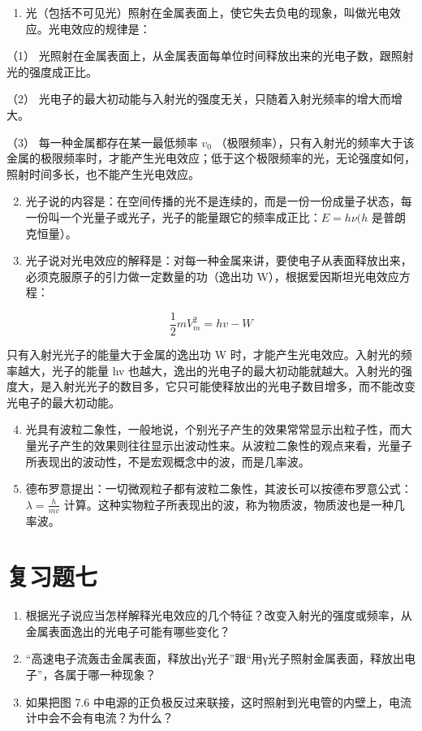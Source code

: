 \begin{enumerate}
\item
  光（包括不可见光）照射在金属表面上，使它失去负电的现象，叫做光电效应。光电效应的规律是：
\end{enumerate}

（1）
光照射在金属表面上，从金属表面每单位时间释放出来的光电子数，跟照射光的强度成正比。

（2）
光电子的最大初动能与入射光的强度无关，只随着入射光频率的增大而增大。

（3） 每一种金属都存在某一最低频率 \(v_{0}\)
（极限频率），只有入射光的频率大于该金属的极限频率时，才能产生光电效应；低于这个极限频率的光，无论强度如何，照射时间多长，也不能产生光电效应。

\begin{enumerate}
\setcounter{enumi}{1}
\item
  光子说的内容是：在空间传播的光不是连续的，而是一份一份成量子状态，每一份叫一个光量子或光子，光子的能量跟它的频率成正比：\(E = h\nu(h\)
  是普朗克恒量）。
\item
  光子说对光电效应的解释是：对每一种金属来讲，要使电子从表面释放出来，必须克服原子的引力做一定数量的功（逸出功
  W），根据爱因斯坦光电效应方程：
\end{enumerate}

\[
\frac {1}{2} m V _ {m} ^ {2} = h v - W
\]

只有入射光光子的能量大于金属的逸出功 W
时，才能产生光电效应。入射光的频率越大，光子的能量 hv
也越大，逸出的光电子的最大初动能就越大。入射光的强度大，是入射光光子的数目多，它只可能使释放出的光电子数目增多，而不能改变光电子的最大初动能。

\begin{enumerate}
\setcounter{enumi}{3}
\item
  光具有波粒二象性，一般地说，个别光子产生的效果常常显示出粒子性，而大量光子产生的效果则往往显示出波动性来。从波粒二象性的观点来看，光量子所表现出的波动性，不是宏观概念中的波，而是几率波。
\item
  德布罗意提出：一切微观粒子都有波粒二象性，其波长可以按德布罗意公式：\(\lambda=\frac{h}{mv}\)
  计算。这种实物粒子所表现出的波，称为物质波，物质波也是一种几率波。
\end{enumerate}

\section{复习题七}

\begin{enumerate}
\item
  根据光子说应当怎样解释光电效应的几个特征？改变入射光的强度或频率，从金属表面逸出的光电子可能有哪些变化？
\item
  ``高速电子流轰击金属表面，释放出γ光子''跟``用γ光子照射金属表面，释放出电子''，各属于哪一种现象？
\item
  如果把图 7.6
  中电源的正负极反过来联接，这时照射到光电管的内壁上，电流计中会不会有电流？为什么？
\end{enumerate}

